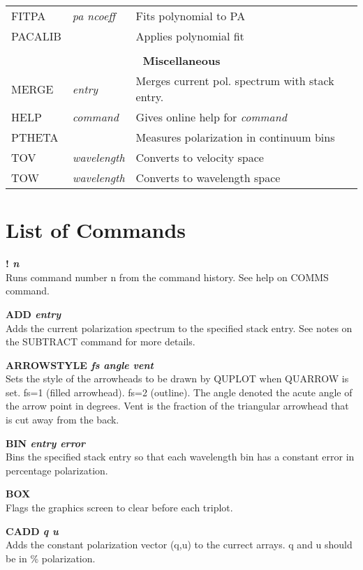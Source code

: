 \begin{center}
\begin{tabular}{lll}
FITPA       & {\it pa ncoeff}     & Fits polynomial to PA \\
PACALIB     &                     & Applies polynomial fit \\
\\
\multicolumn{3}{c}{\bf Miscellaneous} \\ \hline
MERGE       & {\it entry}         & Merges current pol. spectrum with stack entry. \\
HELP    & {\it command}          & Gives online help for {\it command} \\
PTHETA      &                     & Measures polarization in continuum bins \\
TOV     &  {\it wavelength}      & Converts to velocity space \\
TOW     &  {\it wavelength}      & Converts to wavelength space \\

\end{tabular}
\end{center}

\newpage
\section{List of Commands}

{\bf ! \it n} \\
Runs command number n from the command history. See help on COMMS command.

{\bf ADD \it entry } \\
Adds the current polarization spectrum to the specified stack entry. See notes
on the  SUBTRACT command for more details.

{\bf ARROWSTYLE \it fs angle vent} \\
Sets the style of the arrowheads to be drawn by QUPLOT when QUARROW is
set.  fs=1 (filled arrowhead). fs=2 (outline). The angle denoted the
acute angle of the arrow point in degrees. Vent is the fraction of the
triangular arrowhead that is cut away from the back.

{\bf BIN \it entry error} \\
Bins the specified stack entry so that each wavelength bin has a
constant error in percentage polarization.

{\bf BOX} \\
Flags the graphics screen to clear before each triplot.

{\bf CADD \it q u} \\
Adds the constant polarization vector (q,u) to the currect arrays. q and u
should be in \% polarization.

